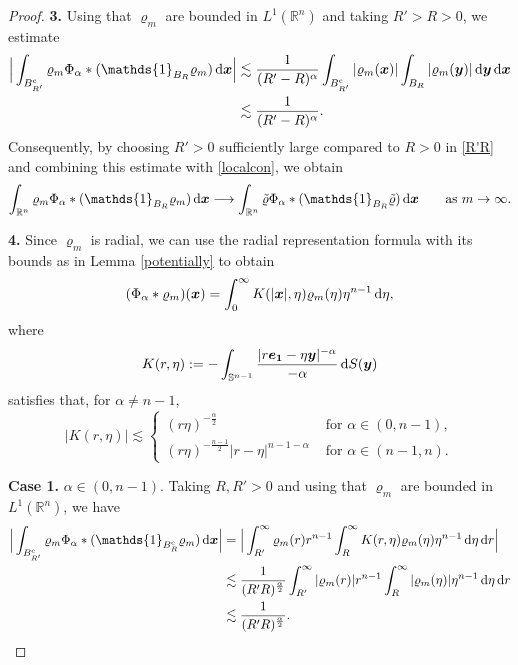 \documentclass[reqno,11pt]{amsart}
\numberwithin{equation}{section}
\theoremstyle{definition}
\def\dd{{\, \rm d}}
\begin{document}
\begin{proof}
\bigskip
\noindent
{\bf 3.}
    Using that $\varrho_m$ are bounded in $L^1(\mathbb{R}^n)$ and taking $R' > R > 0$, we estimate
    \begin{align}\label{R'R}
\begin{split}
  \Big|\int_{B_{R'}^{\rm c}} \varrho_m \Phi_\alpha * (\mathds{1}_{B_R}\varrho_m) \dd \boldsymbol{x}\Big| 
 & \lesssim \frac{1}{(R' - R)^\alpha} \int_{B_{R'}^{\rm c}} |\varrho_m(\boldsymbol{x})| \int_{B_{R}} |\varrho_m(\boldsymbol{y})| \dd \boldsymbol{y} \dd \boldsymbol{x} \\
  & \lesssim \frac{1}{(R' - R)^\alpha}.
 \end{split}
    \end{align}
Consequently, by choosing $R'>0$ sufficiently large compared to $R>0$ in \eqref{R'R} and combining 
this estimate with \eqref{localcon}, we obtain
    \begin{equation}\label{lesslocalcon}
 \int_{\mathbb{R}^n} \varrho_m \Phi_\alpha * (\mathds{1}_{B_R}\varrho_m) \dd \boldsymbol{x} \longrightarrow \int_{\mathbb{R}^n} \tilde{\varrho} \Phi_\alpha * (\mathds{1}_{B_R}\tilde{\varrho}) \dd \boldsymbol{x}\qquad \mbox{as $m \to \infty$}.
    \end{equation}
    
\bigskip
\noindent
{\bf 4.}
Since $\varrho_m$ is radial, we can use the radial representation formula with its bounds 
as in Lemma \ref{potentially} to obtain
    \[
 (\Phi_\alpha * \varrho_m)(\boldsymbol{x}) = \int^\infty_0 K(|\boldsymbol{x}|,\eta) \varrho_m(\eta) \eta^{n-1} \dd \eta,
    \]
    where
    \[
 K(r,\eta) := -\int_{\mathbb{S}^{n-1}} \frac{|r\boldsymbol{e_1}-\eta \boldsymbol{y}|^{-\alpha}}{-\alpha} \dd S (\boldsymbol{y})
    \]
    satisfies that, for $\alpha \neq n-1$,
    \[
 |K(r,\eta)| \lesssim
        \begin{cases}
\displaystyle
(r\eta)^{-\frac{\alpha}{2}} & \mbox{ for $\alpha \in(0,n-1)$}, \\[1mm]
 \displaystyle
 (r\eta)^{-\frac{n-1}{2}} |r-\eta|^{n-1-\alpha}
 & \mbox{ for $\alpha \in (n-1,n)$}.
\end{cases}
    \]
   
   \smallskip
   \noindent
   {\bf Case 1.} $\alpha \in (0,n-1)$. Taking $R,R'>0$ and using that $\varrho_m$ are bounded in $L^1(\mathbb{R}^n)$, we have
    \begin{align}\label{biggRs1}
 \begin{split}
  \Big| \int_{B_{R'}^{\rm c}} \varrho_m \Phi_\alpha * (\mathds{1}_{B_R^{\rm c}}\varrho_m) \dd \boldsymbol{x} \Big| 
 & = \Big| \int^\infty_{R'} \varrho_m(r) r^{n-1} \int^\infty_R K(r,\eta) \varrho_m(\eta) \eta^{n-1} \dd \eta \dd r \Big| \\
 & \lesssim \frac{1}{(R'R)^\frac{\alpha}{2}} \int^\infty_{R'} |\varrho_m(r)| r^{n-1} \int^\infty_R |\varrho_m(\eta)| \eta^{n-1} \dd \eta \dd r \\
 & \lesssim \frac{1}{(R'R)^\frac{\alpha}{2}}.
 \end{split}
    \end{align}
      

\end{proof}
\end{document}

